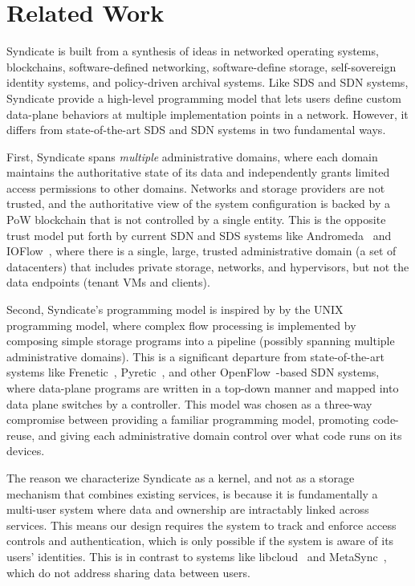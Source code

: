 \section{Related Work}
\label{sec:related-work}

Syndicate is built from a synthesis of ideas in networked operating systems, blockchains,
software-defined networking, software-define storage, self-sovereign
identity systems, and policy-driven archival systems.  Like SDS and SDN
systems, Syndicate provide a high-level programming model that lets users
define custom data-plane behaviors at multiple implementation points in a
network.  However, it differs from
state-of-the-art SDS and SDN systems in two fundamental ways.

First, Syndicate spans \textit{multiple} administrative domains,
where each domain maintains the authoritative state
of its data and independently grants limited access permissions to 
other domains.  Networks and storage providers are not trusted, and the
authoritative view of the system configuration is backed by a PoW blockchain that is not
controlled by a single entity.  This is the
opposite trust model put forth by current SDN and SDS systems like
Andromeda~\cite{andromeda} and IOFlow~\cite{ioflow},
where there is a single, large, trusted administrative domain (a set of datacenters)
that includes private storage,
networks, and hypervisors, but not the data endpoints (tenant VMs and clients).

Second, Syndicate's programming model is inspired by
by the UNIX programming model, where complex flow processing is implemented by
composing simple storage programs into a pipeline (possibly spanning multiple
administrative domains).
This is a significant departure from state-of-the-art systems
like Frenetic~\cite{frenetic}, Pyretic~\cite{pyretic}, and other
OpenFlow~\cite{openflow}-based SDN systems, where data-plane programs are written in a top-down
manner and mapped into data plane switches by a controller.  This model was chosen
as a three-way compromise between providing a familiar programming model, promoting code-reuse,
and giving each administrative domain control over what code runs on
its devices.

The reason we characterize Syndicate as a kernel, and not as a storage mechanism
that combines existing services, is because it is fundamentally a multi-user system where
data and ownership are intractably linked across services.
This means our design requires the system to track and enforce access controls
and authentication, which is only possible if the system is aware of its users'
identities.  This is in contrast to systems like libcloud~\cite{libcloud} and
MetaSync~\cite{metasync}, which do not address sharing data between users.

